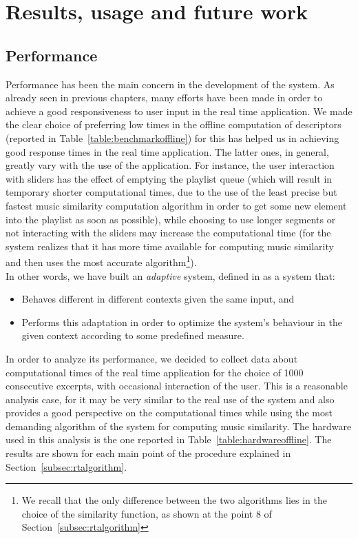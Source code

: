 \chapter{Results, usage and future work} 

\label{Chapter7} 


\section{Performance}
\label{sec:performanceanalysis}
Performance has been the main concern in the development of the system. As already seen in previous chapters, many efforts have been made in order to achieve a good responsiveness to user input in the real time application. We made the clear choice of preferring low times in the offline computation of descriptors (reported in Table~\ref{table:benchmarkoffline}) for this has helped us in achieving good response times in the real time application. The latter ones, in general, greatly vary with the use of the application. For instance, the user interaction with sliders has the effect of emptying the playlist queue (which will result in temporary shorter computational times, due to the use of the least precise but fastest music similarity computation algorithm in order to get some new element into the playlist as soon as possible), while choosing to use longer segments or not interacting with the sliders may increase the computational time (for the system realizes that it has more time available for computing music similarity and then uses the most accurate algorithm\footnote{We recall that the only difference between the two algorithms lies in the choice of the similarity function, as shown at the point 8 of Section~\ref{subsec:rtalgorithm}}). \\
In other words, we have built an \textit{adaptive} system, defined in \cite{stober11} as a system that:
\begin{itemize}
\item Behaves different in different contexts given the same input, and
\item Performs this adaptation in order to optimize the system's behaviour in the given context according to some predefined measure.
\end{itemize}
In order to analyze its performance, we decided to collect data about computational times of the real time application for the choice of 1000 consecutive excerpts, with occasional interaction of the user. This is a reasonable analysis case, for it may be very similar to the real use of the system and also provides a good perspective on the computational times while using the most demanding algorithm of the system for computing music similarity. The hardware used in this analysis is the one reported in Table~\ref{table:hardwareoffline}. The results are shown for each main point of the procedure explained in Section~\ref{subsec:rtalgorithm}.\\

